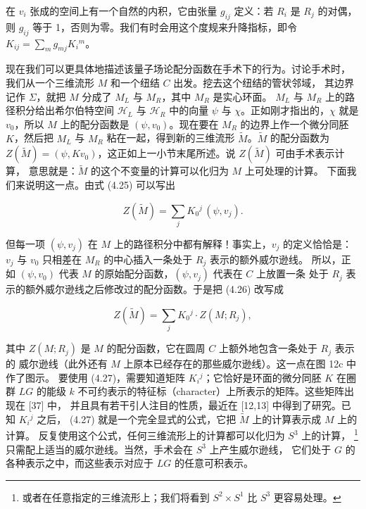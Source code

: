 \documentclass[11pt,a4paper]{article}
\begin{document}
在 $v_i$ 张成的空间上有一个自然的内积，它由张量 $g_{ij}$ 定义：若 $R_i$ 是 $R_j$ 的对偶，
则 $g_{ij}$ 等于 1，否则为零。我们有时会用这个度规来升降指标，即令
$K_{ij}=\sum_m g_{mj}K_i{}^m$。


现在我们可以更具体地描述该量子场论配分函数在手术下的行为。讨论手术时，
我们从一个三维流形 $M$ 和一个纽结 $C$ 出发。挖去这个纽结的管状邻域，
其边界记作 $\Sigma$，就把 $M$ 分成了 $M_L$ 与 $M_R$，其中 $M_R$ 是实心环面。
$M_L$ 与 $M_R$ 上的路径积分给出希尔伯特空间 $\mathcal{H}_L$ 与 $\mathcal{H}_R$ 中的向量
$\psi$ 与 $\chi$。正如刚才指出的，$\chi$ 就是 $v_0$，所以 $M$ 上的配分函数是
$(\psi,v_0)$。现在要在 $M_R$ 的边界上作一个微分同胚 $K$，然后把 $M_L$ 与 $M_R$
粘在一起，得到新的三维流形 $\tilde{M}$。$\tilde{M}$ 的配分函数为
$Z(\tilde{M})=(\psi,Kv_0)$，这正如上一小节末尾所述。说 $Z(\tilde{M})$ 可由手术表示计算，
意思就是：$\tilde{M}$ 的这个不变量的计算可以化归为 $M$ 上可处理的计算。
下面我们来说明这一点。由式 (4.25) 可以写出

\begin{equation}
    Z(\tilde{M}) = \sum_j K_0{}^j\,(\psi,v_j). \tag{4.26}
\end{equation}

但每一项 $(\psi,v_j)$ 在 $M$ 上的路径积分中都有解释！事实上，$v_j$ 的定义恰恰是：
$v_j$ 与 $v_0$ 只相差在 $M_R$ 的中心插入一条处于 $R_j$ 表示的额外威尔逊线。
所以，正如 $(\psi,v_0)$ 代表 $M$ 的原始配分函数，$(\psi,v_j)$ 代表在 $C$ 上放置一条
处于 $R_j$ 表示的额外威尔逊线之后修改过的配分函数。于是把 (4.26) 改写成

\begin{equation}
    Z(\tilde{M}) = \sum_j K_0{}^j\cdot Z(M;R_j), \tag{4.27}
\end{equation}

其中 $Z(M;R_j)$ 是 $M$ 的配分函数，它在圆周 $C$ 上额外地包含一条处于 $R_j$ 表示的
威尔逊线（此外还有 $M$ 上原本已经存在的那些威尔逊线）。这一点在图 12c 中作了图示。
要使用 (4.27)，需要知道矩阵 $K_i{}^j$；它恰好是环面的微分同胚 $K$ 在圈群 $LG$
的能级 $k$ 不可约表示的特征标（character）上所表示的矩阵。这些矩阵出现在 [37] 中，
并且具有若干引人注目的性质，最近在 [12,13] 中得到了研究。已知 $K_i{}^j$ 之后，
(4.27) 就是一个完全显式的公式，它把 $\tilde{M}$ 上的计算表示成 $M$ 上的计算。
反复使用这个公式，任何三维流形上的计算都可以化归为 $S^3$ 上的计算，%
\footnote{或者在任意指定的三维流形上；我们将看到 $S^2\times S^1$ 比 $S^3$ 更容易处理。}
只需配上适当的威尔逊线。当然，手术会在 $S^3$ 上产生威尔逊线，
它们处于 $G$ 的各种表示之中，而这些表示对应于 $LG$ 的任意可积表示。
\end{document}
